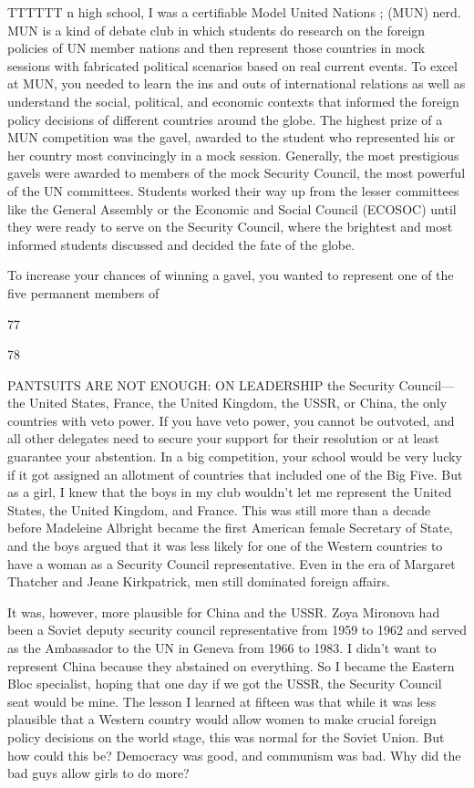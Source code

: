 TTTTTT n high school, I was a certifiable Model United Nations ; (MUN) nerd. MUN is a kind of debate club in which students do research on the foreign policies of UN member nations and then represent those countries in mock sessions with fabricated political scenarios based on real current events. To excel at MUN, you needed to learn the ins and outs of international relations as well as understand the social, political, and economic contexts that informed the foreign policy decisions of different countries around the globe. The highest prize of a MUN competition was the gavel, awarded to the student who represented his or her country most convincingly in a mock session. Generally, the most prestigious gavels were awarded to members of the mock Security Council, the most powerful of the UN committees. Students worked their way up from the lesser committees like the General Assembly or the Economic and Social Council (ECOSOC) until they were ready to serve on the Security Council, where the brightest and most informed students discussed and decided the fate of the globe.
 \par 
To increase your chances of winning a gavel, you wanted to represent one of the five permanent members of
 \par 
77
 \par 
78
 \par 
PANTSUITS ARE NOT ENOUGH: ON LEADERSHIP the Security Council—the United States, France, the United Kingdom, the USSR, or China, the only countries with veto power. If you have veto power, you cannot be outvoted, and all other delegates need to secure your support for their resolution or at least guarantee your abstention. In a big competition, your school would be very lucky if it got assigned an allotment of countries that included one of the Big Five. But as a girl, I knew that the boys in my club wouldn't let me represent the United States, the United Kingdom, and France. This was still more than a decade before Madeleine Albright became the first American female Secretary of State, and the boys argued that it was less likely for one of the Western countries to have a woman as a Security Council representative. Even in the era of Margaret Thatcher and Jeane Kirkpatrick, men still dominated foreign affairs.
 \par 
It was, however, more plausible for China and the USSR. Zoya Mironova had been a Soviet deputy security council representative from 1959 to 1962 and served as the Ambassador to the UN in Geneva from 1966 to 1983. I didn’t want to represent China because they abstained on everything. So I became the Eastern Bloc specialist, hoping that one day if we got the USSR, the Security Council seat would be mine. The lesson I learned at fifteen was that while it was less plausible that a Western country would allow women to make crucial foreign policy decisions on the world stage, this was normal for the Soviet Union. But how could this be? Democracy was good, and communism was bad. Why did the bad guys allow girls to do more?
